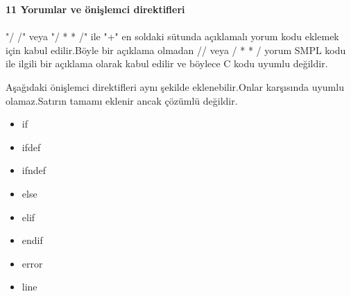 \documentclass[a4paper,22pt]{article}
\begin{document}
\textbf{11 Yorumlar ve önişlemci direktifleri}\\
\\
"/ /" veya "/ * * /" ile "+" en soldaki sütunda açıklamalı yorum kodu eklemek için kabul edilir.Böyle bir açıklama olmadan // veya / * * / yorum SMPL kodu ile
ilgili bir açıklama olarak kabul edilir ve böylece C kodu uyumlu değildir.

  Aşağıdaki önişlemci direktifleri aynı şekilde eklenebilir.Onlar karşısında uyumlu olamaz.Satırın tamamı eklenir ancak çözümlü değildir.\\
\begin{itemize}
\item if
\item ifdef
\item ifndef
\item else
\item elif
\item endif
\item error
\item line
\end{itemize}
\end{document}
